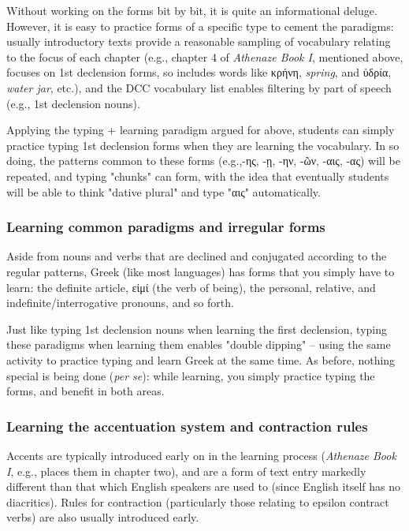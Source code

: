 \documentclass[11pt]{article}
\begin{document}
Without working on the forms bit by bit, it is quite an informational deluge. However, it is easy to practice forms of a specific type to cement the paradigms: usually introductory texts provide a reasonable sampling of vocabulary relating to the focus of each chapter (e.g., chapter 4 of \emph{Athenaze Book I}, mentioned above, focuses on 1st declension forms, so includes words like κρήνη, \emph{spring}, and ὑδρία, \emph{water jar}, etc.), and the DCC vocabulary list enables filtering by part of speech (e.g., 1st declension nouns).

Applying the typing + learning paradigm argued for above, students can simply practice typing 1st declension forms when they are learning the vocabulary. In so doing, the patterns common to these forms (e.g.,-ης, -ῃ, -ην, -ῶν, -αις, -ας) will be repeated, and typing "chunks" can form, with the idea that eventually students will be able to think "dative plural" and type "αις" automatically.

\subsubsection{Learning common paradigms and irregular forms}
\label{sec:orgb4bb1bd}

Aside from nouns and verbs that are declined and conjugated according to the regular patterns, Greek (like most languages) has forms that you simply have to learn: the definite article, εἰμί (the verb of being), the personal, relative, and indefinite/interrogative pronouns, and so forth.

Just like typing 1st declension nouns when learning the first declension, typing these paradigms when learning them enables "double dipping" -- using the same activity to practice typing and learn Greek at the same time. As before, nothing special is being done (\emph{per se}): while learning, you simply practice typing the forms, and benefit in both areas.

\subsubsection{Learning the accentuation system and contraction rules}
\label{sec:org90451eb}

Accents are typically introduced early on in the learning process (\emph{Athenaze Book I}, e.g., places them in chapter two), and are a form of text entry markedly different than that which English speakers are used to (since English itself has no diacritics). Rules for contraction (particularly those relating to epsilon contract verbs) are also usually introduced early.
\end{document}
